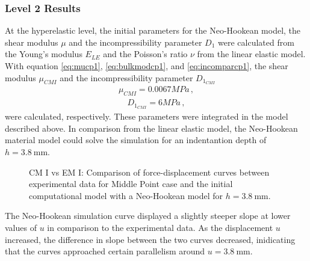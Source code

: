 \subsubsection*{Level 2 Results}
At the hyperelastic level, the initial parameters for the Neo-Hookean model, 
the shear modulus $\mu$ and the incompressibility parameter $D_1$ were calculated from the Young's modulus $E_{LE}$
and the Poisson's ratio $\nu$ from the linear elastic model. With equation \ref{eq:mucp1}, \ref{eq:bulkmodcp1}, 
and \ref{eq:incomparcp1}, the shear modulus $\mu_{CMI}$ and the incompressibility parameter $D_{1_{CMI}}$
\begin{align}
    \mu_{CMI} = 0.0067 MPa \, ,
    \label{eq:mucp1result}
\end{align}
\begin{align}
    D_{1_{CMI}} = 6 MPa \, ,
    \label{eq:d1cp1result}
\end{align}
were calculated, respectively. These parameters were integrated in the model described above. In comparison from 
the linear elastic model, the Neo-Hookean material model could solve the simulation for an indentantion depth of 
$h =  \SI{3.8}{\milli \meter}$.
\begin{figure}%
    \centering
   \quad
   \caption[Computational model I vs Experimental data - Neo-Hookean]{CM I vs EM I: Comparison of force-displacement curves between experimental data for Middle Point case and the initial computational model with a Neo-Hookean model for $h = \SI{3.8}{\milli \meter}$.}%
   \label{fig:MPIvsCPINH}%
\end{figure}
The Neo-Hookean simulation curve displayed a slightly steeper slope at lower values of $u$ in comparison to the experimental data.
As the displacement $u$ increased, the difference in slope between the two curves decreased, inidicating that the 
curves approached certain parallelism around $u = \SI{3.8}{\milli \meter}$.\\


